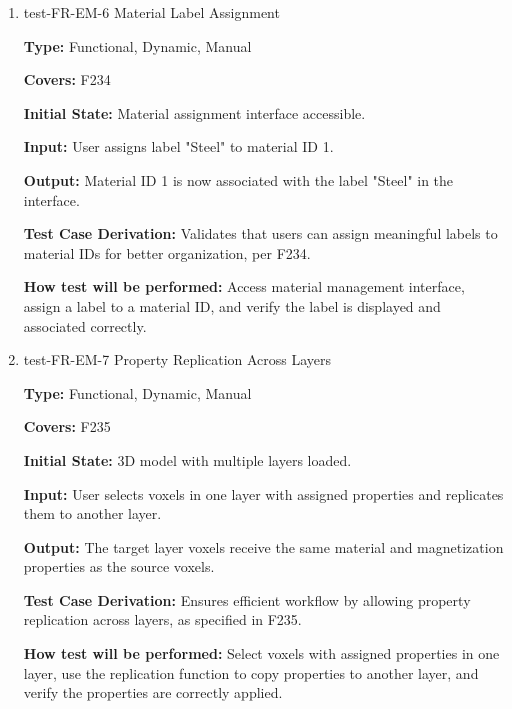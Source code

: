 \documentclass[12pt, titlepage]{article}
\begin{document}
\begin{enumerate}
\textbf{Output:} All selected voxels display the assigned material and update their visual representation.

\textbf{Test Case Derivation:} Ensures the system can handle bulk material assignment operations, satisfying F233.
					
\textbf{How test will be performed:} Select multiple voxels, assign a material ID, and verify all selected voxels receive the assignment.

\item{test-FR-EM-6 Material Label Assignment\\}
\label{sec:t-em-6}

\textbf{Type:} Functional, Dynamic, Manual

\textbf{Covers:} F234
					
\textbf{Initial State:} Material assignment interface accessible.
					
\textbf{Input:} User assigns label "Steel" to material ID 1.
					
\textbf{Output:} Material ID 1 is now associated with the label "Steel" in the interface.

\textbf{Test Case Derivation:} Validates that users can assign meaningful labels to material IDs for better organization, per F234.
					
\textbf{How test will be performed:} Access material management interface, assign a label to a material ID, and verify the label is displayed and associated correctly.

\item{test-FR-EM-7 Property Replication Across Layers\\}
\label{sec:t-em-7}

\textbf{Type:} Functional, Dynamic, Manual

\textbf{Covers:} F235
					
\textbf{Initial State:} 3D model with multiple layers loaded.
					
\textbf{Input:} User selects voxels in one layer with assigned properties and replicates them to another layer.
					
\textbf{Output:} The target layer voxels receive the same material and magnetization properties as the source voxels.

\textbf{Test Case Derivation:} Ensures efficient workflow by allowing property replication across layers, as specified in F235.
					
\textbf{How test will be performed:} Select voxels with assigned properties in one layer, use the replication function to copy properties to another layer, and verify the properties are correctly applied.


\end{enumerate}
\end{document}

